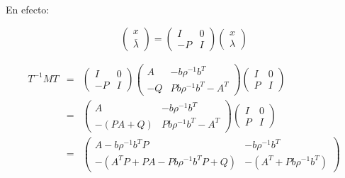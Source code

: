         En efecto:

        \begin{equation*}
            \begin{pmatrix}
                x \\
                \bar{\lambda}
            \end{pmatrix} =
            \begin{pmatrix}
                I & 0 \\
                -P & I
            \end{pmatrix}
            \begin{pmatrix}
                x \\
                \lambda
            \end{pmatrix}
        \end{equation*}

        \begin{eqnarray*}
            T^{-1} M T & = &
            \begin{pmatrix}
                I & 0 \\
                -P & I
            \end{pmatrix}
            \begin{pmatrix}
                A & -b \rho^{-1} b^T \\
                -Q & P b \rho^{-1} b^T - A^T
            \end{pmatrix}
            \begin{pmatrix}
                I & 0 \\
                P & I
            \end{pmatrix} \\
            & = &
            \begin{pmatrix}
                A & -b \rho^{-1} b^T \\
                -(PA + Q) & P b \rho^{-1} b^T - A^T
            \end{pmatrix}
            \begin{pmatrix}
                I & 0 \\
                P & I
            \end{pmatrix} \\
            & = &
            \begin{pmatrix}
                A - b \rho^{-1} b^T P & -b \rho^{-1} b^T \\
                -(A^TP + PA - Pb \rho^{-1} b^T P + Q) & - (A^T + P b \rho^{-1} b^T)
            \end{pmatrix}
        \end{eqnarray*}

